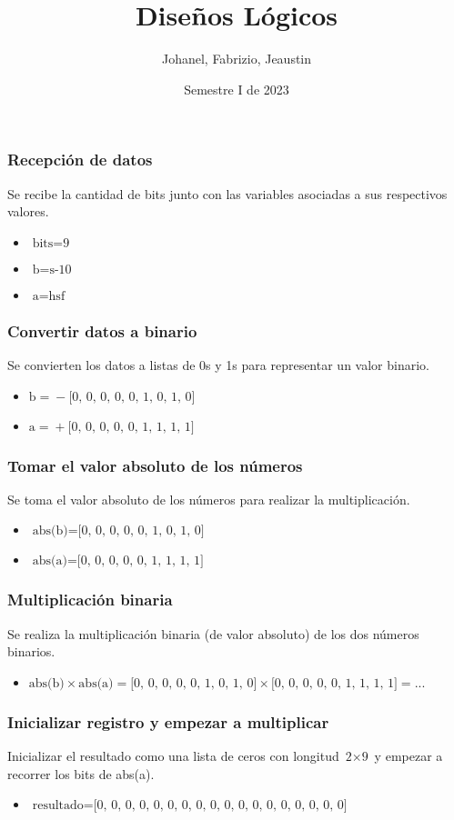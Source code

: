 \documentclass{beamer}
\title{Diseños Lógicos}
\author{Johanel, Fabrizio, Jeaustin}
\institute{Tecnológico de Costa Rica}
\date{Semestre I de 2023}
\begin{document}
\begin{frame}
\frametitle{Recepción de datos}
Se recibe la cantidad de bits junto con las variables asociadas a sus respectivos valores.
\begin{itemize}
\item $\text{bits}=\text{9}$
\item $\text{b}=\text{s-10}$
\item $\text{a}=\text{hsf}$
\end{itemize}
\end{frame}
\begin{frame}
\frametitle{Convertir datos a binario}
Se convierten los datos a listas de 0s y 1s para representar un valor binario.
\begin{itemize}
\item $\text{b}=\text{}-\text{[0, 0, 0, 0, 0, 1, 0, 1, 0]}$
\item $\text{a}=\text{}+\text{[0, 0, 0, 0, 0, 1, 1, 1, 1]}$
\end{itemize}
\end{frame}
\begin{frame}
\frametitle{Tomar el valor absoluto de los números}
Se toma el valor absoluto de los números para realizar la multiplicación.
\begin{itemize}
\item $\text{abs(b)}=\text{[0, 0, 0, 0, 0, 1, 0, 1, 0]}$
\item $\text{abs(a)}=\text{[0, 0, 0, 0, 0, 1, 1, 1, 1]}$
\end{itemize}
\end{frame}
\begin{frame}
\frametitle{Multiplicación binaria}
Se realiza la multiplicación binaria (de valor absoluto) de los dos números binarios.
\begin{itemize}
\item $\text{abs(b)}\times\text{abs(a)}=\text{[0, 0, 0, 0, 0, 1, 0, 1, 0]}\times\text{[0, 0, 0, 0, 0, 1, 1, 1, 1]}=\text{...}$
\end{itemize}
\end{frame}
\begin{frame}
\frametitle{Inicializar registro y empezar a multiplicar}
Inicializar el resultado como una lista de ceros con longitud $\text{2}\times\text{9}$ y empezar a recorrer los bits de abs(a).
\begin{itemize}
\item $\text{resultado}=\text{[0, 0, 0, 0, 0, 0, 0, 0, 0, 0, 0, 0, 0, 0, 0, 0, 0, 0]}$
\end{itemize}
\end{frame}
\end{document}
